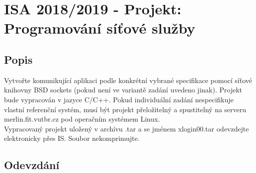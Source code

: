 \documentclass[11pt, a4paper, titlepage]{article}
\begin{document}
\section*{ISA 2018/2019 - Projekt: Programování síťové služby}
\bigskip


\subsection*{Popis}

Vytvořte komunikující aplikaci podle konkrétní vybrané specifikace pomocí síťové knihovny BSD sockets (pokud není ve variantě zadání uvedeno jinak). Projekt bude vypracován v jazyce C/C++. Pokud individuální zadání nespecifikuje vlastní referenční systém, musí být projekt přeložitelný a spustitelný na serveru merlin.fit.vutbr.cz pod operačním systémem Linux.\\

Vypracovaný projekt uložený v archívu .tar a se jménem xlogin00.tar odevzdejte elektronicky přes IS. Soubor nekomprimujte.


\subsection*{Odevzdání}
\end{document}
